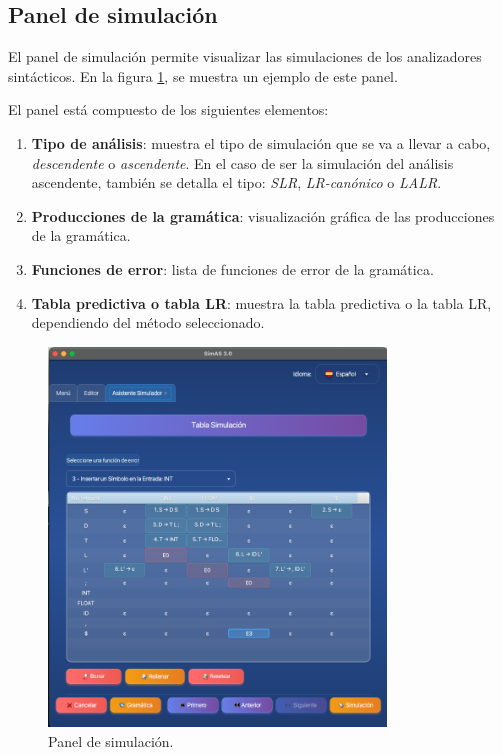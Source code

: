 \subsection{Panel de simulación}

El panel de simulación permite visualizar las simulaciones de los analizadores sintácticos. En la figura \ref{fig:d6}, se muestra un ejemplo de este panel.

El panel está compuesto de los siguientes elementos:
\begin{enumerate}
 \item \textbf{Tipo de análisis}: muestra el tipo de simulación que se va a llevar a cabo, \textit{descendente} o \textit{ascendente}. En el caso de ser la simulación del análisis ascendente, también se detalla el tipo: \textit{SLR}, \textit{LR-canónico} o \textit{LALR}.
 \item \textbf{Producciones de la gramática}: visualización gráfica de las producciones de la gramática.
 \item \textbf{Funciones de error}: lista de funciones de error de la gramática.
 \item \textbf{Tabla predictiva o tabla LR}: muestra la tabla predictiva o la tabla LR, dependiendo del método seleccionado.
\end{enumerate}

\begin{figure}[htp]
\centering
	\includegraphics[width=0.8\textwidth]{figuras2/simulador/paso5_tablaPredictivaCompleta.png}
	\caption{Panel de simulación.}
	\label{fig:d6}
\end{figure}

